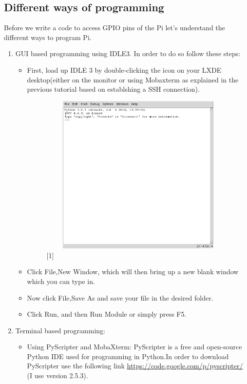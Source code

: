 \documentclass[11pt,a4paper]{report}
\begin{document}
\begin{flushleft}
	\section{Different ways of programming}
	Before we write a code to access GPIO pins of the Pi let's understand the different ways to program Pi.
	\begin{enumerate}
		\item GUI based programming using IDLE3. In order to do so follow these steps:
		\begin{itemize}
			\item First, load up IDLE 3 by double-clicking the icon on your LXDE desktop(either on the monitor or using Mobaxterm as explained in the previous tutorial based on establshing a SSH connection).
			\begin{figure}[h!]
				\includegraphics[width=10cm, height=8cm]{idle3.png}
				\centering
				\caption{[1]}
			\end{figure}
			\item Click File,New Window, which will then bring up a new blank window which you can type in.
			\item Now click File,Save As and save your file in the desired folder.
			\item Click Run, and then Run Module or simply press F5.
		\end{itemize}
		\item Terminal based programming:
		\begin{itemize}
			\item Using PyScripter and MobaXterm:
			PyScripter is a free and open-source Python IDE used for programming in Python.In order to download PyScripter use the following link \url{https://code.google.com/p/pyscripter/} (I use version 2.5.3).
			\newline \begin{enumerate}

\end{enumerate}
\end{itemize}
\end{enumerate}
\end{flushleft}
\end{document}
